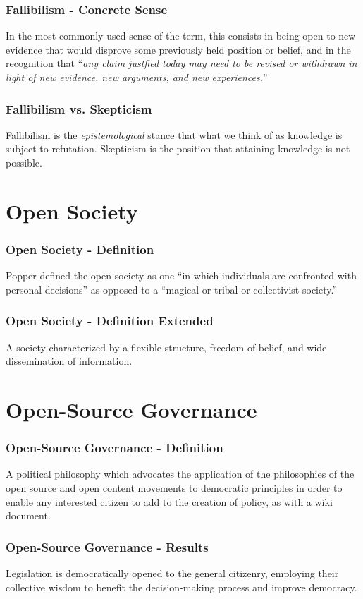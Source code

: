 \documentclass{beamer}
\begin{document}
\begin{frame}\frametitle{\textbf{\LARGE{\textrm{Fallibilism - Concrete Sense}}}}
In the most commonly used sense of the term, this consists in being open to new evidence that would 
disprove some previously held position or belief, and in the recognition that ``\emph{any claim justfied today 
may need to be revised or withdrawn in light of new evidence, new arguments, and new experiences.}''\cite{kompridis2006critique}
\end{frame}

\begin{frame}\frametitle{\textbf{\LARGE{\textrm{Fallibilism vs. Skepticism}}}}
Fallibilism is the \emph{epistemological} stance that what we think of as knowledge is subject to refutation. 
Skepticism is the position that attaining knowledge is not possible.
\end{frame}

\section{Open Society}
\begin{frame}\frametitle{\textbf{\LARGE{\textrm{Open Society - Definition}}}}
Popper defined the open society as one ``in which individuals are confronted with personal decisions'' as opposed to a ``magical or tribal or collectivist society.''\cite{popper2011open}
\end{frame}
\begin{frame}\frametitle{\textbf{\LARGE{\textrm{Open Society - Definition Extended}}}}
A society characterized by a flexible structure, freedom of belief, and wide dissemination of information.
\end{frame}

\section{Open-Source Governance}
\begin{frame}\frametitle{\textbf{\LARGE{\textrm{Open-Source Governance - Definition}}}}
 A political philosophy which advocates the application of the philosophies of the open source and open content movements to democratic principles in order to enable any interested citizen to add to the creation of policy, as with a wiki document.
\end{frame}

\begin{frame}\frametitle{\textbf{\LARGE{\textrm{Open-Source Governance - Results}}}}
Legislation is democratically opened to the general citizenry, employing their collective wisdom to benefit the decision-making process and improve democracy.
\end{frame}
\end{document}
